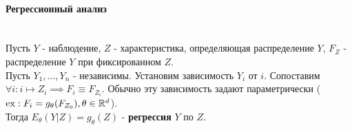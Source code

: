 \documentclass[main.tex]{subfiles}
\begin{document}
\paragraph{Регрессионный анализ}
\begin{definition}[Регрессия] ~\\
	Пусть $Y$ - наблюдение,  $Z$ - характеристика, определяющая распределение $Y$, $F_Z$ - распределение $Y$ при фиксированном $Z$.\\
	Пусть $Y_1,\dots,Y_n$ - независимы.
	Установим зависимость $Y_i$ от $i$.
	Сопоставим $\forall i: i \mapsto Z_i \implies F_i \equiv F_{Z_i}$.
	Обычно эту зависимость задают параметрически ($\operatorname{ex}: F_i = g_\theta(F_{Z_0}), \theta \in \mathbb{R}^d$).\\
	Тогда $E_\theta(Y|Z) = g_\theta(Z)$ - \textbf{регрессия} $Y$ по $Z$.
\end{definition}
\end{document}
